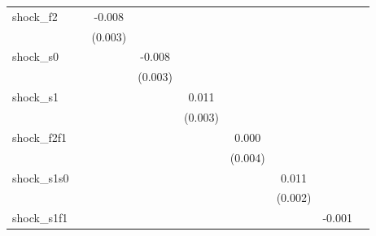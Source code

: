 {\begin{tabular}{l*{8}{c}}
\addlinespace
shock\_f2    &                     &      -0.008\sym{**} &                     &                     &                     &                     &                     &                     \\
            &                     &     (0.003)         &                     &                     &                     &                     &                     &                     \\
\addlinespace
shock\_s0    &                     &                     &      -0.008\sym{***}&                     &                     &                     &                     &                     \\
            &                     &                     &     (0.003)         &                     &                     &                     &                     &                     \\
\addlinespace
shock\_s1    &                     &                     &                     &       0.011\sym{***}&                     &                     &                     &                     \\
            &                     &                     &                     &     (0.003)         &                     &                     &                     &                     \\
\addlinespace
shock\_f2f1  &                     &                     &                     &                     &       0.000         &                     &                     &                     \\
            &                     &                     &                     &                     &     (0.004)         &                     &                     &                     \\
\addlinespace
shock\_s1s0  &                     &                     &                     &                     &                     &       0.011\sym{***}&                     &                     \\
            &                     &                     &                     &                     &                     &     (0.002)         &                     &                     \\
\addlinespace
shock\_s1f1  &                     &                     &                     &                     &                     &                     &      -0.001         &                     \\

\end{tabular}}
